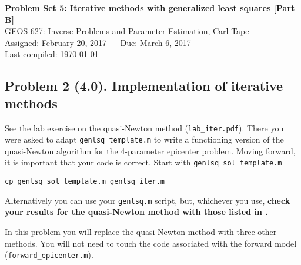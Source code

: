 \documentclass[11pt,titlepage,fleqn]{article}
\begin{document}
 

\begin{spacing}{1.2}
\centering
{\large \bf Problem Set 5: Iterative methods with generalized least squares [Part B]} \\
GEOS 627: Inverse Problems and Parameter Estimation, Carl Tape \\
Assigned: February 20, 2017 --- Due: March 6, 2017 \\
Last compiled: \today
\end{spacing}


\subsection*{Problem 2 (4.0). Implementation of iterative methods}

See the lab exercise on the quasi-Newton method (\verb+lab_iter.pdf+). There you were asked to adapt \verb+genlsq_template.m+ to write a functioning version of the quasi-Newton algorithm for the 4-parameter epicenter problem. Moving forward, it is important that your code is correct. Start with \verb+genlsq_sol_template.m+
%
\begin{verbatim}
cp genlsq_sol_template.m genlsq_iter.m
\end{verbatim}
%
Alternatively you can use your \verb+genlsq.m+ script, but, whichever you use, {\bf check your results for the quasi-Newton method with those listed in .}

In this problem you will replace the quasi-Newton method with three other methods. You will not need to touch the code associated with the forward model (\verb+forward_epicenter.m+).
\end{document}
